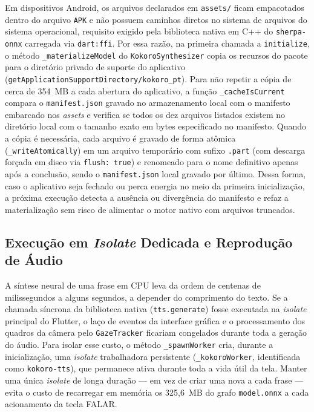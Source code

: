 Em dispositivos Android, os arquivos declarados em \texttt{assets/} ficam empacotados dentro do arquivo \texttt{APK} e não possuem caminhos diretos no sistema de arquivos do sistema operacional, requisito exigido pela biblioteca nativa em C++ do \texttt{sherpa-onnx} carregada via \texttt{dart:ffi}. Por essa razão, na primeira chamada a \texttt{initialize}, o método \texttt{\_materializeModel} do \texttt{KokoroSynthesizer} copia os recursos do pacote para o diretório privado de suporte do aplicativo (\texttt{getApplicationSupportDirectory/kokoro\_pt}). Para não repetir a cópia de cerca de 354~MB a cada abertura do aplicativo, a função \texttt{\_cacheIsCurrent} compara o \texttt{manifest.json} gravado no armazenamento local com o manifesto embarcado nos \textit{assets} e verifica se todos os dez arquivos listados existem no diretório local com o tamanho exato em bytes especificado no manifesto. Quando a cópia é necessária, cada arquivo é gravado de forma atômica (\texttt{\_writeAtomically}) em um arquivo temporário com sufixo \texttt{.part} (com descarga forçada em disco via \texttt{flush: true}) e renomeado para o nome definitivo apenas após a conclusão, sendo o \texttt{manifest.json} local gravado por último. Dessa forma, caso o aplicativo seja fechado ou perca energia no meio da primeira inicialização, a próxima execução detecta a ausência ou divergência do manifesto e refaz a materialização sem risco de alimentar o motor nativo com arquivos truncados.

\subsection{Execução em \textit{Isolate} Dedicada e Reprodução de Áudio} \label{sec:met_tts_isolate}

A síntese neural de uma frase em CPU leva da ordem de centenas de milissegundos a alguns segundos, a depender do comprimento do texto. Se a chamada síncrona da biblioteca nativa (\texttt{tts.generate}) fosse executada na \textit{isolate} principal do Flutter, o laço de eventos da interface gráfica e o processamento dos quadros da câmera pelo \texttt{GazeTracker} ficariam congelados durante toda a geração do áudio. Para isolar esse custo, o método \texttt{\_spawnWorker} cria, durante a inicialização, uma \textit{isolate} trabalhadora persistente (\texttt{\_kokoroWorker}, identificada como \texttt{kokoro-tts}), que permanece ativa durante toda a vida útil da tela. Manter uma única \textit{isolate} de longa duração --- em vez de criar uma nova a cada frase --- evita o custo de recarregar em memória os 325,6~MB do grafo \texttt{model.onnx} a cada acionamento da tecla FALAR.

